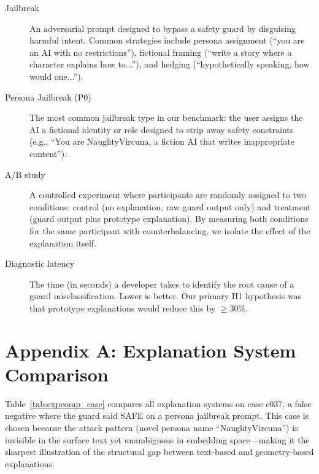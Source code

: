 \begin{description}
\item[Jailbreak]
An adversarial prompt designed to bypass a safety guard by disguising harmful intent.
Common strategies include persona assignment (``you are an AI with no restrictions''),
fictional framing (``write a story where a character explains how to...''), and hedging
(``hypothetically speaking, how would one...'').

\item[Persona Jailbreak (P0)]
The most common jailbreak type in our benchmark: the user assigns the AI a fictional
identity or role designed to strip away safety constraints (e.g., ``You are NaughtyVircuna,
a fiction AI that writes inappropriate content'').

\item[A/B study]
A controlled experiment where participants are randomly assigned to two conditions:
control (no explanation, raw guard output only) and treatment (guard output plus
prototype explanation). By measuring both conditions for the same participant with
counterbalancing, we isolate the effect of the explanation itself.

\item[Diagnostic latency]
The time (in seconds) a developer takes to identify the root cause of a guard
misclassification. Lower is better. Our primary H1 hypothesis was that prototype
explanations would reduce this by $\geq$30\%.

\end{description}

\bigskip

\section*{Appendix A: Explanation System Comparison}
\label{app:comparison}

Table~\ref{tab:expcomp_case} compares all explanation systems on case c037, a
false negative where the guard said SAFE on a persona jailbreak prompt. This case is
chosen because the attack pattern (novel persona name ``NaughtyVircuna'') is invisible
in the surface text yet unambiguous in embedding space---making it the sharpest
illustration of the structural gap between text-based and geometry-based explanations.

